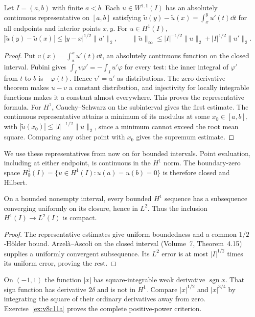\begin{theorem}\label{thm:w11}
Let $I=(a,b)$ with finite $a<b$. Each $u\in W^{1,1}(I)$ has an absolutely continuous representative on $[a,b]$ satisfying
$\tilde u(y)-\tilde u(x)=\int_x^yu'(t)\dd t$ for all endpoints and interior points $x,y$. For $u\in H^1(I)$,
\[
|\tilde u(y)-\tilde u(x)|\le|y-x|^{1/2}\|u'\|_2,
\qquad
\|\tilde u\|_\infty\le |I|^{-1/2}\|u\|_2+|I|^{1/2}\|u'\|_2.
\]
\end{theorem}
\begin{proof}
Put $v(x)=\int_a^xu'(t)\dd t$, an absolutely continuous function on the closed interval. Fubini gives $\int_Iv\varphi'=-\int_Iu'\varphi$ for every test: the inner integral of $\varphi'$ from $t$ to $b$ is $-\varphi(t)$. Hence $v'=u'$ as distributions. The zero-derivative theorem makes $u-v$ a constant distribution, and injectivity for locally integrable functions makes it a constant almost everywhere. This proves the representative formula.
For $H^1$, Cauchy--Schwarz on the subinterval gives the first estimate. The continuous representative attains a minimum of its modulus at some $x_0\in[a,b]$, with $|\tilde u(x_0)|\le|I|^{-1/2}\|u\|_2$, since a minimum cannot exceed the root mean square. Comparing any other point with $x_0$ gives the supremum estimate.
\end{proof}

We use these representatives from now on for bounded intervals. Point evaluation, including at either endpoint, is continuous in the $H^1$ norm. The boundary-zero space $H^1_0(I)=\{u\in H^1(I):u(a)=u(b)=0\}$ is therefore closed and Hilbert.

\begin{theorem}[Rellich]\label{thm:rellich}
On a bounded nonempty interval, every bounded $H^1$ sequence has a subsequence converging uniformly on its closure, hence in $L^2$. Thus the inclusion $H^1(I)\to L^2(I)$ is compact.
\end{theorem}
\begin{proof}
The representative estimates give uniform boundedness and a common $1/2$-H\"older bound. Arzel\`a--Ascoli on the closed interval (Volume~7, Theorem~4.15) supplies a uniformly convergent subsequence. Its $L^2$ error is at most $|I|^{1/2}$ times its uniform error, proving the rest.
\end{proof}

\begin{think}
On $(-1,1)$ the function $|x|$ has square-integrable weak derivative $\operatorname{sgn}x$. That sign function has derivative $2\delta$ and is not in $H^1$. Compare $|x|^{1/2}$ and $|x|^{3/4}$ by integrating the square of their ordinary derivatives away from zero. Exercise~\ref{ex:v8c11a} proves the complete positive-power criterion.
\end{think}

